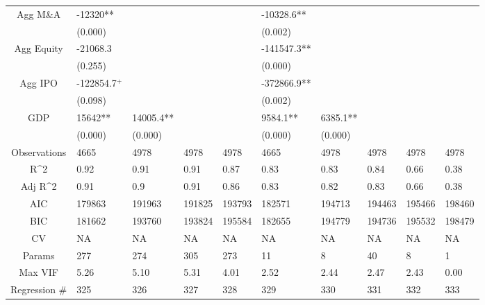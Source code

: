 \documentclass{article}
\begin{document}
\begin{table}[H]
\begin{tabular}{|clllllllll|}
  Agg M\&A & -12320** &  &  &  & -10328.6** &  &  &  &  \\ 
   & (0.000) &  &  &  & (0.002) &  &  &  &  \\ 
  Agg Equity & -21068.3 &  &  &  & -141547.3** &  &  &  &  \\ 
   & (0.255) &  &  &  & (0.000) &  &  &  &  \\ 
  Agg IPO & -122854.7$^{+}$ &  &  &  & -372866.9** &  &  &  &  \\ 
   & (0.098) &  &  &  & (0.002) &  &  &  &  \\ 
  GDP & 15642** & 14005.4** &  &  & 9584.1** & 6385.1** &  &  &  \\ 
   & (0.000) & (0.000) &  &  & (0.000) & (0.000) &  &  &  \\ 
  \hline 
 Observations & 4665 & 4978 & 4978 & 4978 & 4665 & 4978 & 4978 & 4978 & 4978 \\ 
  R^2 & 0.92 & 0.91 & 0.91 & 0.87 & 0.83 & 0.83 & 0.84 & 0.66 & 0.38 \\ 
  Adj R^2 & 0.91 & 0.9 & 0.91 & 0.86 & 0.83 & 0.82 & 0.83 & 0.66 & 0.38 \\ 
  AIC & 179863 & 191963 & 191825 & 193793 & 182571 & 194713 & 194463 & 195466 & 198460 \\ 
  BIC & 181662 & 193760 & 193824 & 195584 & 182655 & 194779 & 194736 & 195532 & 198479 \\ 
  CV & NA & NA & NA & NA & NA & NA & NA & NA & NA \\ 
  Params & 277 & 274 & 305 & 273 & 11 & 8 & 40 & 8 & 1 \\ 
  Max VIF & 5.26 & 5.10 & 5.31 & 4.01 & 2.52 & 2.44 & 2.47 & 2.43 & 0.00 \\ 
  Regression \# & 325 & 326 & 327 & 328 & 329 & 330 & 331 & 332 & 333 \\ 
   \hline
\end{tabular}
 
\end{table}
\end{document}
